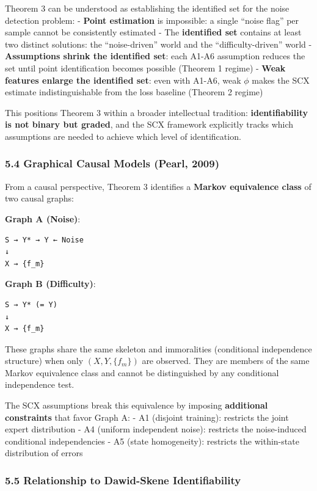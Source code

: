 \documentclass[
  12pt,
]{ctexart}
\begin{document}
Theorem 3 can be understood as establishing the identified set for the
noise detection problem: - \textbf{Point estimation} is impossible: a
single ``noise flag'' per sample cannot be consistently estimated - The
\textbf{identified set} contains at least two distinct solutions: the
``noise-driven'' world and the ``difficulty-driven'' world -
\textbf{Assumptions shrink the identified set}: each A1-A6 assumption
reduces the set until point identification becomes possible (Theorem 1
regime) - \textbf{Weak features enlarge the identified set}: even with
A1-A6, weak \(\phi\) makes the SCX estimate indistinguishable from the
loss baseline (Theorem 2 regime)

This positions Theorem 3 within a broader intellectual tradition:
\textbf{identifiability is not binary but graded}, and the SCX framework
explicitly tracks which assumptions are needed to achieve which level of
identification.

\subsubsection{5.4 Graphical Causal Models (Pearl,
2009)}\label{graphical-causal-models-pearl-2009}

From a causal perspective, Theorem 3 identifies a \textbf{Markov
equivalence class} of two causal graphs:

\textbf{Graph A (Noise)}:

\begin{verbatim}
S → Y* → Y ← Noise
↓
X → {f_m}
\end{verbatim}

\textbf{Graph B (Difficulty)}:

\begin{verbatim}
S → Y* (= Y)
↓
X → {f_m}
\end{verbatim}

These graphs share the same skeleton and immoralities (conditional
independence structure) when only \((X, Y, \{f_m\})\) are observed. They
are members of the same Markov equivalence class and cannot be
distinguished by any conditional independence test.

The SCX assumptions break this equivalence by imposing
\textbf{additional constraints} that favor Graph A: - A1 (disjoint
training): restricts the joint expert distribution - A4 (uniform
independent noise): restricts the noise-induced conditional
independencies - A5 (state homogeneity): restricts the within-state
distribution of errors

\subsubsection{5.5 Relationship to Dawid-Skene
Identifiability}\label{relationship-to-dawid-skene-identifiability}
\end{document}
